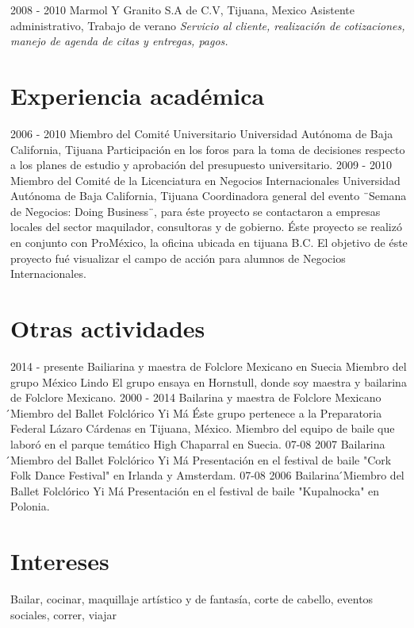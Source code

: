 \documentclass[]{friggeri-cv}
\begin{document}
\begin{entrylist}
  \entry
    {2008 - 2010}
    {Marmol Y Granito S.A de C.V, Tijuana, Mexico}
    {Asistente administrativo, Trabajo de verano}
    {\emph{Servicio al cliente, realización de cotizaciones, manejo de agenda de citas y entregas, pagos.}}
\end{entrylist}

\section{Experiencia académica}
\begin{entrylist}
  \entry
    {2006 - 2010}
    {Miembro del Comité Universitario}
    {Universidad Autónoma de Baja California, Tijuana}
    {Participación en los foros para la toma de decisiones respecto a los planes de estudio y aprobación del presupuesto universitario.}
  \entry
    {2009 - 2010}
    {Miembro del Comité de la Licenciatura en Negocios Internacionales}
    {Universidad Autónoma de Baja California, Tijuana}
    {Coordinadora general del evento ¨Semana de Negocios: Doing Business¨, para éste proyecto se contactaron a empresas locales del sector maquilador, consultoras y de gobierno.
    Éste proyecto se realizó en conjunto con ProMéxico, la oficina ubicada en tijuana B.C.
    El objetivo de éste proyecto fué visualizar el campo de acción para alumnos de Negocios Internacionales.}
\end{entrylist}

\section{Otras actividades}

\begin{entrylist}
  \entry
    {2014 - presente}
    {Bailiarina y maestra de Folclore Mexicano en Suecia}
    {Miembro del grupo México Lindo}
    {El grupo ensaya en Hornstull, donde soy maestra y bailarina de Folclore Mexicano.}
  \entry
    {2000 - 2014}
    {Bailarina y maestra de Folclore Mexicano}
    {́Miembro del Ballet Folclórico Yi Má}
    {Éste grupo pertenece a la Preparatoria Federal Lázaro Cárdenas en Tijuana, México.
    Miembro del equipo de baile que laboró en el parque temático High Chaparral en Suecia.}
  \entry
    {07-08 2007}
    {Bailarina}
    {́Miembro del Ballet Folclórico Yi Má}
    {Presentación en el festival de baile "Cork Folk
    Dance Festival" en Irlanda y Amsterdam.}
  \entry
    {07-08 2006}
    {Bailarina}
    {́Miembro del Ballet Folclórico Yi Má}
    {Presentación en el festival de baile "Kupalnocka" en Polonia.}
\end{entrylist}

\section{Intereses}
    Bailar, cocinar, maquillaje artístico y de fantasía, corte de cabello, eventos sociales, correr, viajar
\end{document}
